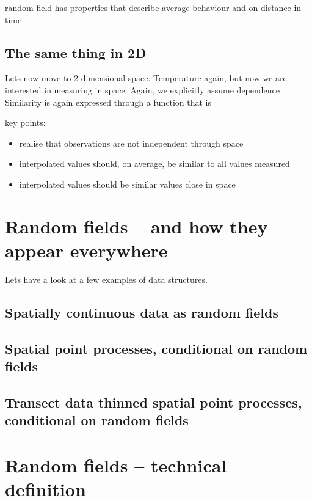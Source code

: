random field has properties that describe average behaviour and on distance in time


\subsection{The same thing in 2D}
Lets now move to 2 dimensional space.  Temperature again, but now we are interested in measuring in space. Again, we explicitly assume dependence 
Similarity is again expressed through a function that is 

key points:
\begin{itemize}
\item realise that observations are not independent through space
\item interpolated values should, on average, be similar to all values measured
\item interpolated values should be similar values close in space
\end{itemize}

\section{Random fields -- and how they appear everywhere}

Lets have a look at a few examples of data structures.

\subsection{Spatially continuous data as random fields}

\subsection{Spatial point processes, conditional on random fields}

\subsection{Transect data thinned spatial point processes, conditional on random fields}

\section{Random fields -- technical definition}

